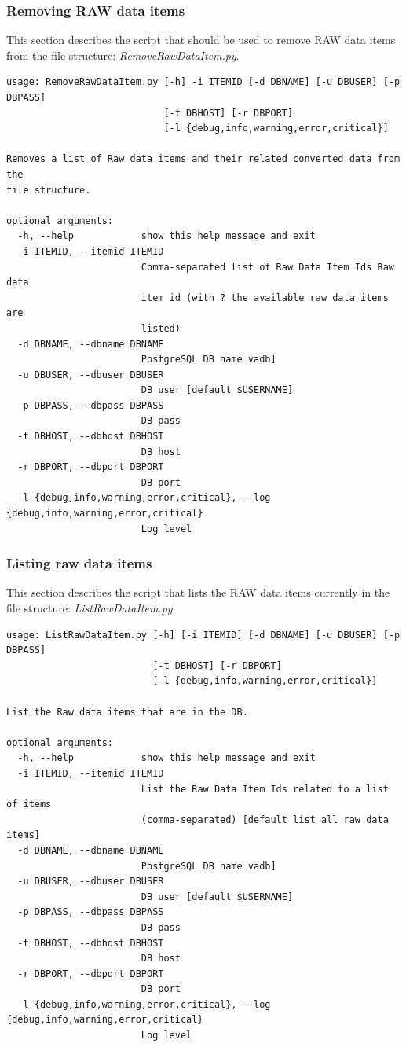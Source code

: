 \subsubsection{Removing RAW data items}
This section describes the script that should be used to remove RAW data items from the file structure: \textit{RemoveRawDataItem.py}.
\begin{Verbatim}[fontfamily=courier,commandchars=\\\{\},fontsize=\footnotesize]
 usage: RemoveRawDataItem.py [-h] -i ITEMID [-d DBNAME] [-u DBUSER] [-p DBPASS]
                            [-t DBHOST] [-r DBPORT]
                            [-l {debug,info,warning,error,critical}]

Removes a list of Raw data items and their related converted data from the
file structure.

optional arguments:
  -h, --help            show this help message and exit
  -i ITEMID, --itemid ITEMID
                        Comma-separated list of Raw Data Item Ids Raw data
                        item id (with ? the available raw data items are
                        listed)
  -d DBNAME, --dbname DBNAME
                        PostgreSQL DB name vadb]
  -u DBUSER, --dbuser DBUSER
                        DB user [default $USERNAME]
  -p DBPASS, --dbpass DBPASS
                        DB pass
  -t DBHOST, --dbhost DBHOST
                        DB host
  -r DBPORT, --dbport DBPORT
                        DB port
  -l {debug,info,warning,error,critical}, --log {debug,info,warning,error,critical}
                        Log level
\end{Verbatim}

\subsubsection{Listing raw data items}
This section describes the script that lists the RAW data items currently in the file structure: \textit{ListRawDataItem.py}.
\begin{Verbatim}[fontfamily=courier,commandchars=\\\{\},fontsize=\footnotesize]
 usage: ListRawDataItem.py [-h] [-i ITEMID] [-d DBNAME] [-u DBUSER] [-p DBPASS]
                          [-t DBHOST] [-r DBPORT]
                          [-l {debug,info,warning,error,critical}]

List the Raw data items that are in the DB.

optional arguments:
  -h, --help            show this help message and exit
  -i ITEMID, --itemid ITEMID
                        List the Raw Data Item Ids related to a list of items
                        (comma-separated) [default list all raw data items]
  -d DBNAME, --dbname DBNAME
                        PostgreSQL DB name vadb]
  -u DBUSER, --dbuser DBUSER
                        DB user [default $USERNAME]
  -p DBPASS, --dbpass DBPASS
                        DB pass
  -t DBHOST, --dbhost DBHOST
                        DB host
  -r DBPORT, --dbport DBPORT
                        DB port
  -l {debug,info,warning,error,critical}, --log {debug,info,warning,error,critical}
                        Log level
\end{Verbatim}
